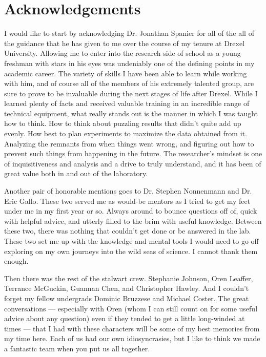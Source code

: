 \chapter*{Acknowledgements}


I would like to start by acknowledging Dr. Jonathan Spanier for all of the all of the guidance that he has given to me over the course of my tenure at Drexel University. Allowing me to enter into the research side of school as a young freshman with stars in his eyes was undeniably one of the defining points in my academic career. The variety of skills I have been able to learn while working with him, and of course all of the members of his extremely talented group, are sure to prove to be invaluable during the next stages of life after Drexel. While I learned plenty of facts and received valuable training in an incredible range of technical equipment, what really stands out is the manner in which I was taught how to think. How to think about puzzling results that didn't quite add up evenly. How best to plan experiments to maximize the data obtained from it. Analyzing the remnants from when things went wrong, and figuring out how to prevent such things from happening in the future. The researcher's mindset is one of inquisitiveness and analysis and a drive to truly understand, and it has been of great value both in and out of the laboratory. 

Another pair of honorable mentions goes to Dr. Stephen Nonnenmann and Dr. Eric Gallo. These two served me as would-be mentors as I tried to get my feet under me in my first year or so. Always around to bounce questions off of, quick with helpful advice, and utterly filled to the brim with useful knowledge. Between these two, there was nothing that couldn't get done or be answered in the lab. These two set me up with the knowledge and mental tools I would need to go off exploring on my own journeys into the wild seas of science. I cannot thank them enough. 

Then there was the rest of the stalwart crew. Stephanie Johnson, Oren Leaffer, Terrance McGuckin, Guannan Chen, and Christopher Hawley. And I couldn't forget my fellow undergrads Dominic Bruzzese and Michael Coster. The great conversations --- especially with Oren (whom I can still count on for some useful advice about any question) even if they tended to get a little long-winded at times --- that I had with these characters will be some of my best memories from my time here. Each of us had our own idiosyncrasies, but I like to think we made a fantastic team when you put us all together. 

